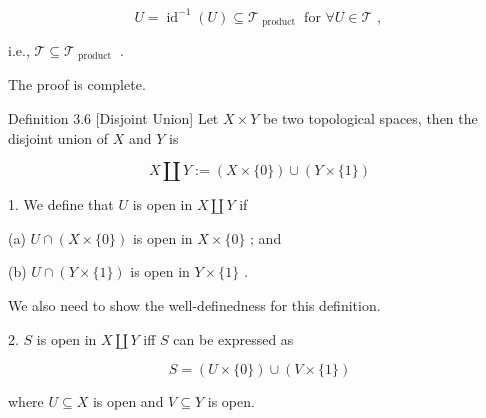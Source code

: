 \[
U = {\operatorname{id}}^{-1}\left( U\right)  \subseteq  {\mathcal{T}}_{\text{ product }}\text{ for }\forall U \in  \mathcal{T}\text{ , }
\]

i.e., \(\mathcal{T} \subseteq  {\mathcal{T}}_{\text{ product }}\) .

The proof is complete.

Definition 3.6 [Disjoint Union] Let \(X \times  Y\) be two topological spaces, then the disjoint union of \(X\) and \(Y\) is

\[
X\coprod Y \mathrel{\text{ := }} \left( {X\times \{ 0\} }\right)  \cup  \left( {Y\times \{ 1\} }\right)
\]

1. We define that \(U\) is open in \(X \coprod  Y\) if

(a) \(U \cap  \left( {X\times \{ 0\} }\right)\) is open in \(X \times  \{ 0\}\) ; and

(b) \(U \cap  \left( {Y\times \{ 1\} }\right)\) is open in \(Y \times  \{ 1\}\) .

We also need to show the well-definedness for this definition.

2. \(S\) is open in \(X \coprod  Y\) iff \(S\) can be expressed as

\[
S = \left( {U\times \{ 0\} }\right)  \cup  \left( {V\times \{ 1\} }\right)
\]

where \(U \subseteq  X\) is open and \(V \subseteq  Y\) is open.